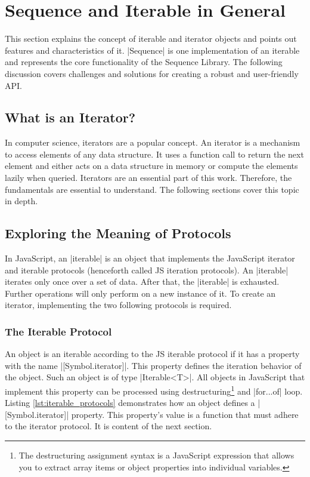 \section{Sequence and Iterable in General}
\label{sec:Sequence and Iterable in General}
This section explains the concept of iterable and iterator objects and points
out features and characteristics of it. |Sequence| is one implementation of
an iterable and represents the core functionality of the Sequence Library. The following
discussion covers challenges and solutions for creating a robust and
user-friendly API.

\subsection{What is an Iterator?}
\label{sub:What is an Iterator?}
In computer science, iterators are a popular concept. An iterator is a mechanism 
to access elements of any data structure. It uses a function call to return the 
next element and either acts on a data structure in memory or compute the 
elements lazily when queried. Iterators are an essential part of this work. Therefore, 
the fundamentals are essential to understand. The following sections cover
this topic in depth.

\subsection{Exploring the Meaning of Protocols}
\label{sub:Exploring the Meaning of Protocols}
In JavaScript, an |iterable| is an object that implements the JavaScript iterator
and iterable protocols \cite{mdn_protocols}
(henceforth called JS iteration protocols). An |iterable| iterates only once 
over a set of data. After that, the |iterable| is exhausted. Further operations 
will only perform on a new instance of it.
\newline
To create an iterator, implementing the two following protocols is required.

\subsubsection{The Iterable Protocol}
\label{subsub:The Iterable Protocol}
An object is an iterable according to the JS iterable protocol if it has a
property with the name |[Symbol.iterator]|. This property defines the iteration
behavior of the object. Such an object is of type |Iterable<T>|.
All objects in JavaScript that implement this property can be processed using 
destructuring\footnote{The destructuring assignment syntax is a JavaScript
expression that allows you to extract array items or object properties into
individual variables.} and |for...of| loop. 
Listing \ref{lst:iterable_protocols} demonstrates how an object defines a
|[Symbol.iterator]| property.
This property's value is a function that must adhere to the iterator protocol.
It is content of the next section.

